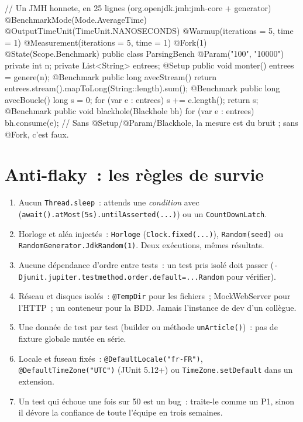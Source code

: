 \begin{codejava}
// Un JMH honnete, en 25 lignes (org.openjdk.jmh:jmh-core + generator)
@BenchmarkMode(Mode.AverageTime) @OutputTimeUnit(TimeUnit.NANOSECONDS)
@Warmup(iterations = 5, time = 1) @Measurement(iterations = 5, time = 1) @Fork(1) @State(Scope.Benchmark)
public class ParsingBench {
    @Param({"100", "10000"}) private int n;
    private List<String> entrees;
    @Setup public void monter() { entrees = genere(n); }
    @Benchmark public long avecStream() { return entrees.stream().mapToLong(String::length).sum(); }
    @Benchmark public long avecBoucle() { long s = 0; for (var e : entrees) { s += e.length(); } return s; }
    @Benchmark public void blackhole(Blackhole bh) { for (var e : entrees) { bh.consume(e); } }
}
// Sans @Setup/@Param/Blackhole, la mesure est du bruit ; sans @Fork, c'est faux.
\end{codejava}

\section{Anti-flaky~: les r\`egles de survie}

\begin{enumerate}
  \item Aucun \verb|Thread.sleep|~: attends une \emph{condition} avec 
        (\verb|await().atMost(5s).untilAsserted(...)|) ou un \verb|CountDownLatch|.
  \item Horloge et al\'ea inject\'es~: \verb|Horloge| (\verb|Clock.fixed(...)|), \verb|Random(seed)| ou
        \verb|RandomGenerator.JdkRandom(1)|. Deux ex\'ecutions, m\^emes r\'esultats.
  \item Aucune d\'ependance d'ordre entre tests~: un test pris isol\'e doit passer
        (\verb|-Djunit.jupiter.testmethod.order.default=...Random| pour v\'erifier).
  \item R\'eseau et disques isol\'es~: \verb|@TempDir| pour les fichiers~; MockWebServer pour l'HTTP~;
        un conteneur pour la BDD. Jamais l'instance de dev d'un coll\`egue.
  \item Une donn\'ee de test par test (builder ou m\'ethode \verb|unArticle()|)~: pas de fixture
        globale mut\'ee en s\'erie.
  \item Locale et fuseau fix\'es~: \verb|@DefaultLocale("fr-FR")|, \verb|@DefaultTimeZone("UTC")|
        (JUnit 5.12+) ou \verb|TimeZone.setDefault| dans un extension.
  \item Un test qui \'echoue une fois sur 50 est un bug~: traite-le comme un P1, sinon il d\'evore
        la confiance de toute l'\'equipe en trois semaines.
\end{enumerate}

